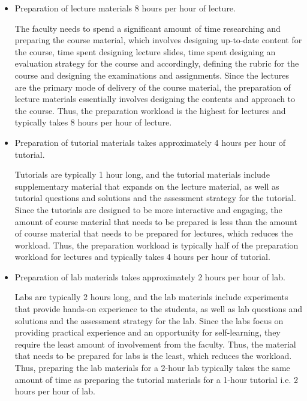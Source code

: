 \begin{itemize}
  \item Preparation of lecture materials 8 hours per hour of lecture.

        The faculty needs to spend a significant amount of time researching and preparing the course material, which involves designing up-to-date content for the course, time spent designing lecture slides, time spent designing an evaluation strategy for the course and accordingly, defining the rubric for the course and designing the examinations and assignments. Since the lectures are the primary mode of delivery of the course material, the preparation of lecture materials essentially involves designing the contents and approach to the course. Thus, the preparation workload is the highest for lectures and typically takes 8 hours per hour of lecture.


  \item Preparation of tutorial materials takes approximately 4 hours per hour of tutorial.

        Tutorials are typically 1 hour long, and the tutorial materials include supplementary material that expands on the lecture material, as well as tutorial questions and solutions and the assessment strategy for the tutorial. Since the tutorials are designed to be more interactive and engaging, the amount of course material that needs to be prepared is less than the amount of course material that needs to be prepared for lectures, which reduces the workload. Thus, the preparation workload is typically half of the preparation workload for lectures and typically takes 4 hours per hour of tutorial.

  \item Preparation of lab materials takes approximately 2 hours per hour of lab.

        Labs are typically 2 hours long, and the lab materials include experiments that provide hands-on experience to the students, as well as lab questions and solutions and the assessment strategy for the lab. Since the labs focus on providing practical experience and an opportunity for self-learning, they require the least amount of involvement from the faculty. Thus, the material that needs to be prepared for labs is the least, which reduces the workload. Thus, preparing the lab materials for a 2-hour lab typically takes the same amount of time as preparing the tutorial materials for a 1-hour tutorial i.e. 2 hours per hour of lab.
\end{itemize}



